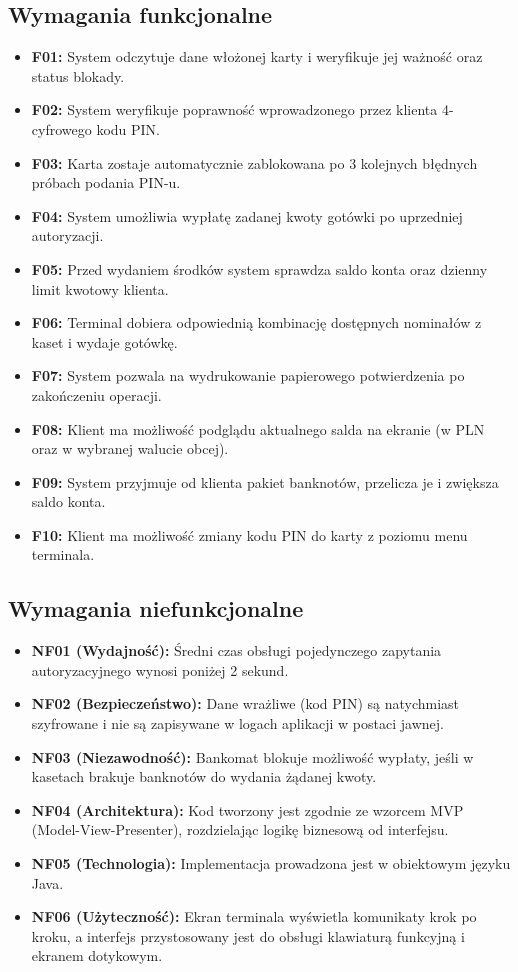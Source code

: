 \documentclass[12pt]{article}
\begin{document}
\subsection{Wymagania funkcjonalne}
\begin{itemize}
    \item \textbf{F01:} System odczytuje dane włożonej karty i weryfikuje jej ważność oraz status blokady.
    \item \textbf{F02:} System weryfikuje poprawność wprowadzonego przez klienta 4-cyfrowego kodu PIN.
    \item \textbf{F03:} Karta zostaje automatycznie zablokowana po 3 kolejnych błędnych próbach podania PIN-u.
    \item \textbf{F04:} System umożliwia wypłatę zadanej kwoty gotówki po uprzedniej autoryzacji.
    \item \textbf{F05:} Przed wydaniem środków system sprawdza saldo konta oraz dzienny limit kwotowy klienta.
    \item \textbf{F06:} Terminal dobiera odpowiednią kombinację dostępnych nominałów z kaset i wydaje gotówkę.
    \item \textbf{F07:} System pozwala na wydrukowanie papierowego potwierdzenia po zakończeniu operacji.
    \item \textbf{F08:} Klient ma możliwość podglądu aktualnego salda na ekranie (w PLN oraz w wybranej walucie obcej).
    \item \textbf{F09:} System przyjmuje od klienta pakiet banknotów, przelicza je i zwiększa saldo konta.
    \item \textbf{F10:} Klient ma możliwość zmiany kodu PIN do karty z poziomu menu terminala.
\end{itemize}

\subsection{Wymagania niefunkcjonalne}
\begin{itemize}
    \item \textbf{NF01 (Wydajność):} Średni czas obsługi pojedynczego zapytania autoryzacyjnego wynosi poniżej 2 sekund.
    \item \textbf{NF02 (Bezpieczeństwo):} Dane wrażliwe (kod PIN) są natychmiast szyfrowane i nie są zapisywane w logach aplikacji w postaci jawnej.
    \item \textbf{NF03 (Niezawodność):} Bankomat blokuje możliwość wypłaty, jeśli w kasetach brakuje banknotów do wydania żądanej kwoty.
    \item \textbf{NF04 (Architektura):} Kod tworzony jest zgodnie ze wzorcem MVP (Model-View-Presenter), rozdzielając logikę biznesową od interfejsu.
    \item \textbf{NF05 (Technologia):} Implementacja prowadzona jest w obiektowym języku Java.
    \item \textbf{NF06 (Użyteczność):} Ekran terminala wyświetla komunikaty krok po kroku, a interfejs przystosowany jest do obsługi klawiaturą funkcyjną i ekranem dotykowym.
\end{itemize}
\end{document}
